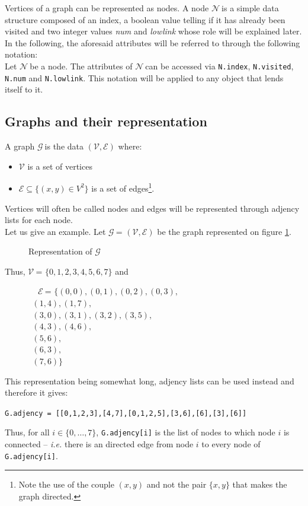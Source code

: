 \documentclass[a4 paper, 12pt]{article}
\def\NN{$\mathcal{N}~$}
\def\GG{$\mathcal{G}~$}
\def\VV{$\mathcal{V}~$}
\def\EE{$\mathcal{E}~$}
\begin{document}
Vertices of a graph can be represented as nodes.
A node \NN is a simple data structure composed of an index, a boolean value telling if it has already been visited and two integer values \textit{num} and \textit{lowlink} whose role will be explained later.\\
In the following, the aforesaid attributes will be referred to through the following notation:\\
Let \NN be a node. The attributes of \NN can be accessed via \texttt{N.index}, \texttt{N.visited}, \texttt{N.num} and \texttt{N.lowlink}. This notation will be applied to any object that lends itself to it.

\subsection{Graphs and their representation}
A graph \GG is the data $(\mathcal{V}, \mathcal{E})$ where:
\begin{itemize}
    \item $\mathcal{V}$ is a set of vertices
    \item $\mathcal{E} \subseteq \{(x,y) \in V^2\}$ is a set of edges\footnote{Note the use of the couple $(x, y)$ and not the pair $\{x, y\}$ that makes the graph directed.}.
\end{itemize}
Vertices will often be called nodes and edges will be represented through adjency lists for each node.\\
Let us give an example. Let \GG = $(\mathcal{V}, \mathcal{E})$ be the graph represented on figure \ref{fig:graph}.
\begin{figure}[!h]
    \caption{Representation of \GG\label{fig:graph}}
\end{figure}
Thus, \VV = $\{0,1,2,3,4,5,6,7\}$ and
\begin{flushleft}
    ~~~~~~~~\EE = $\{(0,0),(0,1),(0,2),(0,3),$\\
    $~~~~~~~~~~~~~~~(1,4),(1,7),$\\
    $~~~~~~~~~~~~~~~(3,0),(3,1),(3,2),(3,5),$\\
    $~~~~~~~~~~~~~~~(4,3),(4,6),$\\
    $~~~~~~~~~~~~~~~(5,6),$\\
    $~~~~~~~~~~~~~~~(6,3),$\\
    $~~~~~~~~~~~~~~~(7,6)\}$
\end{flushleft}

This representation being somewhat long, adjency lists can be used instead and therefore it gives:
\begin{center}
    \texttt{G.adjency = [[0,1,2,3],[4,7],[0,1,2,5],[3,6],[6],[3],[6]]}
\end{center}
Thus, for all $i \in \{0,\ldots,7\}$, \texttt{G.adjency[i]} is the list of nodes to which node $i$ is connected -- \textit{i.e.} there is an directed edge from node $i$ to every node of \texttt{G.adjency[i]}.
\pagebreak
\end{document}
